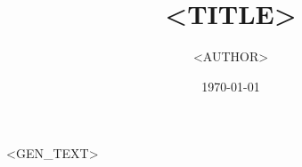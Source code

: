 \documentclass{article}
\title{<TITLE>}
\author{<AUTHOR>}
\date{\today}
\begin{document}
\maketitle

<GEN_TEXT>
\end{document}
